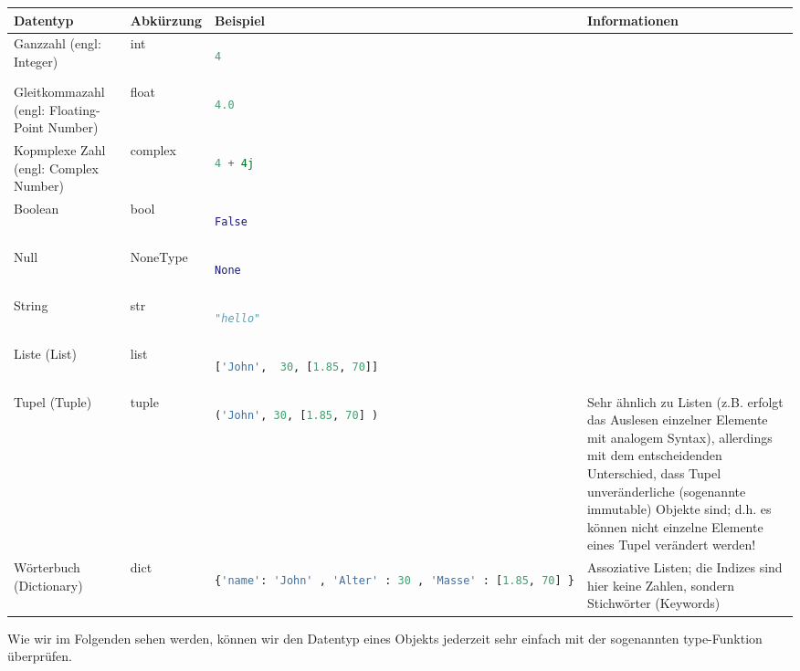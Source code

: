\begin{longtable} {p{4cm}|p{2cm}|p{5cm}|p{4cm}}
\textbf{Datentyp} &  \textbf{Abkürzung} & \textbf{Beispiel}  & \textbf{Informationen} \\  \hline\hline
Ganzzahl (engl: Integer) & int & \begin{lstlisting}[language = Python]
4
\end{lstlisting} \\  \hline
Gleitkommazahl (engl: Floating-Point Number) &  float & \begin{lstlisting}[language = Python]
4.0
\end{lstlisting} \\  \hline
Kopmplexe Zahl (engl: Complex Number) &  complex & \begin{lstlisting}[language = Python]
4 + 4j
\end{lstlisting} \\  \hline
Boolean &  bool & \begin{lstlisting}[language = Python]
False
\end{lstlisting} \\  \hline
Null &  NoneType &   \begin{lstlisting}[language = Python]
None
\end{lstlisting} & \\  \hline
String & str & \begin{lstlisting}[language = Python]
"hello"
\end{lstlisting} \\  \hline
Liste (List)  & list & \begin{lstlisting}[language = Python]
['John',  30, [1.85, 70]]
\end{lstlisting}
 &  \\  \hline
Tupel (Tuple) & tuple & 
\begin{lstlisting}[language = Python]
('John', 30, [1.85, 70] )
\end{lstlisting}
 & Sehr ähnlich zu Listen (z.B. erfolgt das Auslesen einzelner Elemente mit analogem Syntax), allerdings mit dem entscheidenden Unterschied, dass Tupel unveränderliche (sogenannte immutable) Objekte sind; d.h. es können nicht einzelne Elemente eines Tupel verändert werden!  \\  \hline
Wörterbuch (Dictionary) & dict &
\begin{lstlisting}[language = Python]
{'name': 'John' , 'Alter' : 30 , 'Masse' : [1.85, 70] }
\end{lstlisting}
& Assoziative Listen; die Indizes sind hier keine Zahlen, sondern Stichwörter (Keywords)
\end{longtable}
Wie wir im Folgenden sehen werden, können wir den Datentyp eines Objekts jederzeit sehr einfach mit der sogenannten type-Funktion überprüfen. \\


